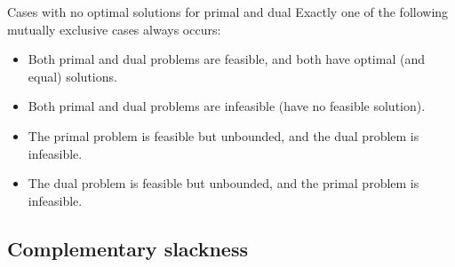 \documentclass[c]{beamer}
\begin{document}
\begin{frame}{Cases with no optimal solutions for primal and dual}
  Exactly one of the following mutually exclusive cases always occurs:
  \begin{itemize}
    \item Both primal and dual problems are feasible, and both have optimal (and equal) solutions.
    \item Both primal and dual problems are infeasible (have no feasible solution).
    \item The primal problem is feasible but unbounded, and the dual problem is infeasible.
    \item The dual problem is feasible but unbounded, and the primal problem is infeasible.
  \end{itemize}
\end{frame}

\subsection{Complementary slackness}
\end{document}
